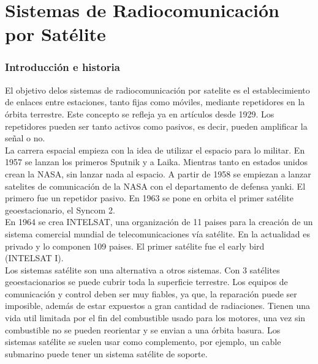 \section{Sistemas de Radiocomunicación por Satélite}
\label{sec:satelite}
	\subsubsection{Introducción e historia}
	\label{ssub:introSat}
		El objetivo delos sistemas de radiocomunicación por satelite es el establecimiento de enlaces entre estaciones, tanto fijas como móviles, mediante repetidores en la órbita terrestre. Este concepto se refleja ya en artículos desde 1929. Los repetidores pueden ser tanto activos como pasivos, es decir, pueden amplificar la señal o no.\\
		La carrera espacial empieza con la idea de utilizar el espacio para lo militar. En 1957 se lanzan los primeros Sputnik y a Laika. Mientras tanto en estados unidos crean la NASA, sin lanzar nada al espacio. A partir de 1958 se empiezan a lanzar satelites de comunicación de la NASA con el departamento de defensa yanki. El primero fue un repetidor pasivo. En 1963 se pone en orbita el primer satélite geoestacionario, el Syncom 2.\\
		En 1964 se crea INTELSAT, una organización de 11 paises para la creación de un sistema comercial mundial de telecomunicaciones vía satélite. En la actualidad es privado y lo componen 109 paises. El primer satélite fue el early bird (INTELSAT I).\\
		Los sistemas satélite son una alternativa a otros sistemas. Con 3 satélites geoestacionarios se puede cubrir toda la superficie terrestre. Los equipos de comunicación y control deben ser muy fiables, ya que, la reparación puede ser imposible, además de estar expuestos a gran cantidad de radiaciones. Tienen una vida util limitada por el fin del combustible usado para los motores, una vez sin combustible no se pueden reorientar y se envian a una órbita basura. Los sistemas satélite se suelen usar como complemento, por ejemplo, un cable submarino puede tener un sistema satélite de soporte.
